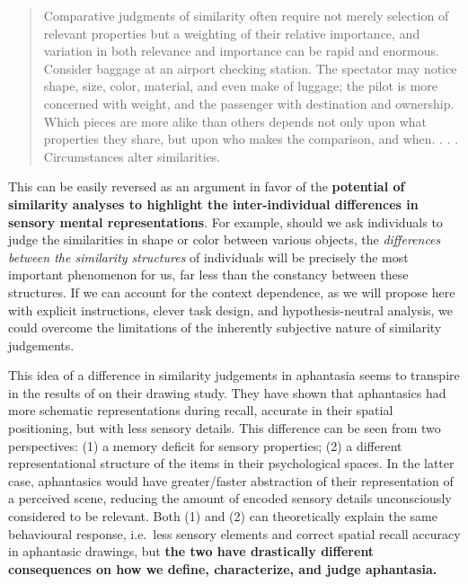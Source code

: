 \documentclass[
  authoryear]{elsarticle}
\begin{document}
\begin{quote}
Comparative judgments of similarity often require not merely selection
of relevant properties but a weighting of their relative importance, and
variation in both relevance and importance can be rapid and enormous.
Consider baggage at an airport checking station. The spectator may
notice shape, size, color, material, and even make of luggage; the pilot
is more concerned with weight, and the passenger with destination and
ownership. Which pieces are more alike than others depends not only upon
what properties they share, but upon who makes the comparison, and when.
. . . Circumstances alter similarities.
{}
\end{quote}

This can be easily reversed as an argument in favor of the
\textbf{potential of similarity analyses to highlight the
inter-individual differences in sensory mental representations}. For
example, should we ask individuals to judge the similarities in shape or
color between various objects, the \emph{differences between the
similarity structures} of individuals will be precisely the most
important phenomenon for us, far less than the constancy between these
structures. If we can account for the context dependence, as we will
propose here with explicit instructions, clever task design, and
hypothesis-neutral analysis, we could overcome the limitations of the
inherently subjective nature of similarity judgements.

This idea of a difference in similarity judgements in aphantasia seems
to transpire in the results of
\citet{bainbridgeQuantifyingAphantasiaDrawing2021} on their drawing
study. They have shown that aphantasics had more schematic
representations during recall, accurate in their spatial positioning,
but with less sensory details. This difference can be seen from two
perspectives: (1) a memory deficit for sensory properties; (2) a
different representational structure of the items in their psychological
spaces. In the latter case, aphantasics would have greater/faster
abstraction of their representation of a perceived scene, reducing the
amount of encoded sensory details unconsciously considered to be
relevant. Both (1) and (2) can theoretically explain the same
behavioural response, i.e.~less sensory elements and correct spatial
recall accuracy in aphantasic drawings, but \textbf{the two have
drastically different consequences on how we define, characterize, and
judge aphantasia.}
\end{document}
